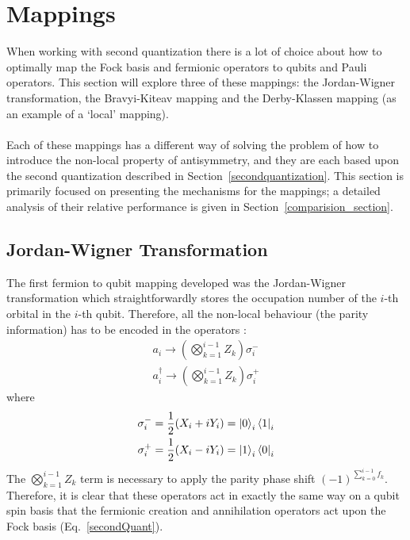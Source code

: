 \documentclass[twoside]{article}
\begin{document}
\section{Mappings} \label{mapping}
When working with second quantization there is a lot of choice about how to optimally map the Fock basis and fermionic operators to qubits and Pauli operators. This section will explore three of these mappings: the Jordan-Wigner transformation, the Bravyi-Kiteav mapping and the Derby-Klassen mapping (as an example of a `local' mapping).\\\\
Each of these mappings has a different way of solving the problem of how to introduce the non-local property of antisymmetry, and they are each based upon the second quantization described in Section~\ref{secondquantization}. This section is primarily focused on presenting the mechanisms for the mappings; a detailed analysis of their relative performance is given in Section~\ref{comparision_section}.
\subsection{Jordan-Wigner Transformation}\label{jordan-wigner_section}
The first fermion to qubit mapping developed was the Jordan-Wigner transformation which straightforwardly stores the occupation number of the $i$-th orbital in the $i$-th qubit. Therefore, all the non-local behaviour (the parity information) has to be encoded in the operators \cite{fermionicEncoding}:
\begin{equation}
        \begin{align}
        a_i \rightarrow \left( \bigotimes_{k=1}^{i-1} Z_k \right) \sigma_i^-\\
        a^{\dagger}_i \rightarrow \left( \bigotimes_{k=1}^{i-1} Z_k \right) \sigma_i^+
\end{align}
\end{equation}
where
\begin{equation}
        \begin{align}
                \sigma^-_i = \frac{1}{2} (X_i + i Y_i) = \ket{0}_i \bra{1}_i\\
                \sigma^+_i = \frac{1}{2} (X_i - i Y_i) = \ket{1}_i \bra{0}_i 
        \end{align}
\end{equation}
The $\bigotimes_{k=1}^{i-1} Z_k$ term is necessary to apply the parity phase shift $(-1)^{\sum_{k=0}^{i-1} f_k}$. Therefore, it is clear that these operators act in exactly the same way on a qubit spin basis that the fermionic creation and annihilation operators act upon the Fock basis (Eq.~\ref{secondQuant}).
\end{document}
